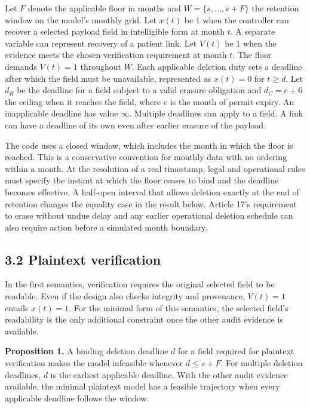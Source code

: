 \documentclass[5p,twocolumn]{elsarticle}
\begin{document}
Let \(F\) denote the applicable floor in months and
\(W = \{ s,\ldots,s + F\}\) the retention window on the model's monthly
grid. Let \(x(t)\) be 1 when the controller can recover a selected
payload field in intelligible form at month \(t\). A separate variable
can represent recovery of a patient link. Let \(V(t)\) be 1 when the
evidence meets the chosen verification requirement at month \(t\). The
floor demands \(V(t) = 1\) throughout \(W\). Each applicable deletion
duty sets a deadline after which the field must be unavailable,
represented as \(x(t) = 0\) for \(t \geq d\). Let \(d_{R}\) be the
deadline for a field subject to a valid erasure obligation and
\(d_{C} = e + 6\) the ceiling when it reaches the field, where \(e\) is
the month of permit expiry. An inapplicable deadline has value
\(\infty\). Multiple deadlines can apply to a field. A link can have a
deadline of its own even after earlier erasure of the payload.

The code uses a closed window, which includes the month in which the
floor is reached. This is a conservative convention for monthly data
with no ordering within a month. At the resolution of a real timestamp,
legal and operational rules must specify the instant at which the floor
ceases to bind and the deadline becomes effective. A half-open interval
that allows deletion exactly at the end of retention changes the
equality case in the result below. Article 17's requirement to erase
without undue delay and any earlier operational deletion schedule can
also require action before a simulated month boundary.

\hypertarget{plaintext-verification}{%
\subsection{3.2 Plaintext verification}\label{plaintext-verification}}

In the first semantics, verification requires the original selected
field to be readable. Even if the design also checks integrity and
provenance, \(V(t) = 1\) entails \(x(t) = 1\). For the minimal form of
this semantics, the selected field's readability is the only additional
constraint once the other audit evidence is available.

\textbf{Proposition 1.} A binding deletion deadline \(d\) for a field
required for plaintext verification makes the model infeasible whenever
\(d \leq s + F\). For multiple deletion deadlines, \(d\) is the earliest
applicable deadline. With the other audit evidence available, the
minimal plaintext model has a feasible trajectory when every applicable
deadline follows the window.
\end{document}
